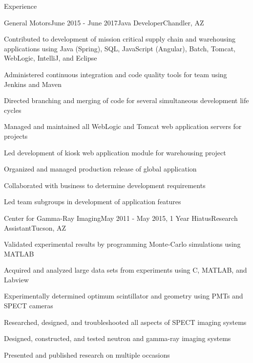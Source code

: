 \documentclass{resume} %
\begin{document}
\begin{rSection}{Experience}
\begin{rSubsection}{General Motors}{June 2015 - June 2017}{Java Developer}{Chandler, AZ}
\setlength{\itemindent}{.0in}\item 
Contributed to development of mission critical supply chain and warehousing applications using
\newline
Java (Spring), SQL, JavaScript (Angular), Batch, Tomcat, WebLogic, IntelliJ, and Eclipse
\setlength{\itemindent}{.0in}\item
Administered continuous integration and code quality tools for team using Jenkins and Maven
\setlength{\itemindent}{.0in}\item
Directed branching and merging of code for several simultaneous development life cycles
\setlength{\itemindent}{.0in}\item
Managed and maintained all WebLogic and Tomcat web application servers for projects
\setlength{\itemindent}{.0in}\item
Led development of kiosk web application module for warehousing project
\setlength{\itemindent}{.0in}\item
Organized and managed production release of global application
\setlength{\itemindent}{.0in}\item
Collaborated with business to determine development requirements
\setlength{\itemindent}{.0in}\item
Led team subgroups in development of application features

\end{rSubsection}


\begin{rSubsection}{Center for Gamma-Ray Imaging}{May 2011 - May 2015, 1 Year Hiatus}{Research Assistant}{Tucson, AZ}
\item Validated experimental results by programming Monte-Carlo simulations using MATLAB
\item Acquired and analyzed large data sets from experiments using C, MATLAB, and Labview 
\item Experimentally determined optimum scintillator and geometry using PMTs and SPECT cameras
\item Researched, designed, and troubleshooted all aspects of SPECT imaging systems
\item Designed, constructed, and tested neutron and gamma-ray imaging systems
\item Presented and published research on multiple occasions

\end{rSubsection}

\end{rSection}
\end{document}
